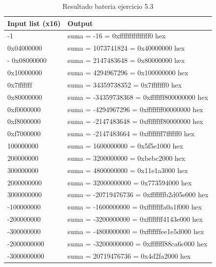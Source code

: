 	
	\begin{table}[htbp]
		\begin{center}
			\begin{tabular}{|l|l|}
				\hline
				Input list (x16) & Output \\
				\hline \hline
				-1 & suma = -16 = 0xfffffffffffffff0 hex  \\ \hline
				0x04000000 & suma = 1073741824 = 0x40000000 hex  \\ \hline-
				0x08000000 & suma = 2147483648 = 0x80000000 hex  \\ \hline
				0x10000000 & suma = 4294967296 = 0x100000000 hex  \\ \hline
				0x7fffffff & suma = 34359738352 = 0x7fffffff0 hex  \\ \hline
				0x80000000 & suma = -34359738368 = 0xfffffff800000000 hex  \\ \hline
				0xf0000000 & suma = -4294967296 = 0xffffffff00000000 hex  \\ \hline
				0xf8000000 & suma = -2147483648 = 0xffffffff80000000 hex  \\ \hline
				0xf7000000 & suma = -2147483664 = 0xffffffff7ffffff0 hex   \\ \hline
				100000000 & suma = 1600000000 = 0x5f5e1000 hex  \\ \hline
				200000000 & suma = 3200000000 = 0xbebc2000 hex  \\ \hline
				300000000 & suma = 4800000000 = 0x11e1a3000 hex  \\ \hline
				2000000000 & suma = 32000000000 = 0x773594000 hex   \\ \hline
				3000000000 & suma = -20719476736 = 0xfffffffb2d05e000 hex  \\ \hline
				-100000000 & suma = -1600000000 = 0xffffffffa0a1f000 hex   \\ \hline
				-200000000 & suma = -3200000000 = 0xffffffff4143e000 hex   \\ \hline
				-300000000 & suma = -4800000000 = 0xfffffffee1e5d000 hex  \\ \hline
				-2000000000 & suma = -32000000000 = 0xfffffff88ca6c000 hex  \\ \hline
				-3000000000 & suma = 20719476736 = 0x4d2fa2000 hex  \\ \hline
			\end{tabular}
			\caption{Resultado bateria ejercicio 5.3}
			\label{tabla:sencilla}
		\end{center}
	\end{table}
	

